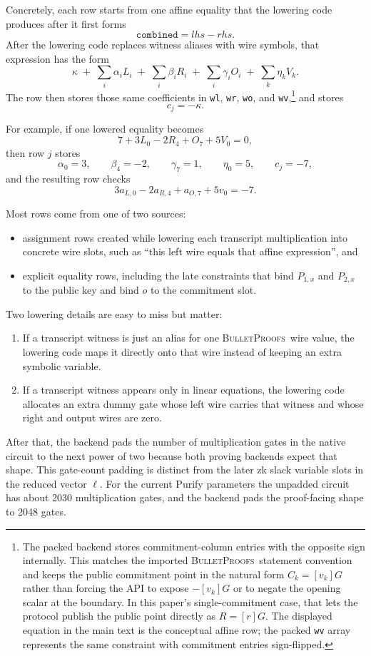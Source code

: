\documentclass[11pt]{article}
\DeclareRobustCommand{\bp}{{\normalfont\scshape BulletProofs}}
\begin{document}
Concretely, each row starts from one affine equality that the lowering code produces after it first
forms
\[
\texttt{combined} = lhs - rhs.
\]
After the lowering code replaces witness aliases with wire symbols, that expression has the form
\[
\kappa
\;+\;
\sum_i \alpha_i L_i
\;+\;
\sum_i \beta_i R_i
\;+\;
\sum_i \gamma_i O_i
\;+\;
\sum_k \eta_k V_k.
\]
The row then stores those same coefficients in \texttt{wl}, \texttt{wr}, \texttt{wo}, and
\texttt{wv},\footnote{The packed backend stores commitment-column entries with the opposite sign
internally. This matches the imported \bp\ statement convention and keeps the public
commitment point in the natural form $C_k = [v_k]G$ rather than forcing the API to expose
$-[v_k]G$ or to negate the opening scalar at the boundary. In this paper's single-commitment case,
that lets the protocol publish the public point directly as $R=[r]G$. The displayed equation in the
main text is the conceptual affine row; the packed \texttt{wv} array represents the same
constraint with commitment entries sign-flipped.} and stores
\[
c_j = -\kappa.
\]

For example, if one lowered equality becomes
\[
7 + 3L_0 - 2R_4 + O_7 + 5V_0 = 0,
\]
then row $j$ stores
\[
\alpha_0 = 3,\qquad \beta_4 = -2,\qquad \gamma_7 = 1,\qquad \eta_0 = 5,\qquad c_j = -7,
\]
and the resulting row checks
\[
3a_{L,0} - 2a_{R,4} + a_{O,7} + 5v_0 = -7.
\]

Most rows come from one of two sources:
\begin{itemize}[nosep]
  \item assignment rows created while lowering each transcript multiplication into concrete wire
  slots, such as ``this left wire equals that affine expression'', and
  \item explicit equality rows, including the late constraints that bind $P_{1,x}$ and $P_{2,x}$
  to the public key and bind $o$ to the commitment slot.
\end{itemize}

Two lowering details are easy to miss but matter:
\begin{enumerate}
  \item If a transcript witness is just an alias for one \bp\ wire value, the lowering code
  maps it directly onto that wire instead of keeping an extra symbolic variable.
  \item If a transcript witness appears only in linear equations, the lowering code allocates an
  extra dummy gate whose left wire carries that witness and whose right and output wires are zero.
\end{enumerate}
After that, the backend pads the number of multiplication gates in the native circuit to the next power
of two because both proving backends expect that shape. This gate-count padding is distinct from
the later zk slack variable slots in the reduced vector $\ell$. For the current Purify parameters the unpadded
circuit has about 2030 multiplication gates, and the backend pads the proof-facing shape to 2048 gates.
\end{document}
